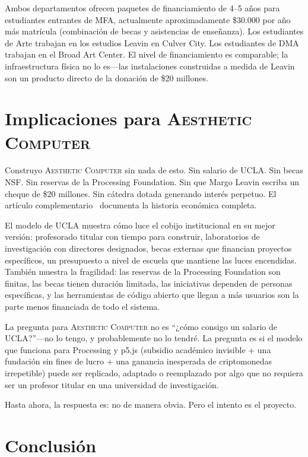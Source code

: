 \documentclass[10pt,letterpaper,twocolumn]{article}
\newcommand{\ac}{\textsc{Aesthetic Computer}}
\newcommand{\dma}{\textsc{DMA}}
\begin{document}
Ambos departamentos ofrecen paquetes de financiamiento de 4--5 años para estudiantes entrantes de MFA, actualmente aproximadamente \$30.000 por año más matrícula (combinación de becas y asistencias de enseñanza). Los estudiantes de Arte trabajan en los estudios Leavin en Culver City. Los estudiantes de \dma{} trabajan en el Broad Art Center. El nivel de financiamiento es comparable; la infraestructura física no lo es---las instalaciones construidas a medida de Leavin son un producto directo de la donación de \$20 millones.

\section{Implicaciones para \ac{}}

Construyo \ac{} sin nada de esto. Sin salario de UCLA. Sin becas NSF. Sin reservas de la Processing Foundation. Sin que Margo Leavin escriba un cheque de \$20 millones. Sin cátedra dotada generando interés perpetuo. El artículo complementario~\citep{scudder2026sustainability} documenta la historia económica completa.

El modelo de UCLA muestra cómo luce el cobijo institucional en su mejor versión: profesorado titular con tiempo para construir, laboratorios de investigación con directores designados, becas externas que financian proyectos específicos, un presupuesto a nivel de escuela que mantiene las luces encendidas. También muestra la fragilidad: las reservas de la Processing Foundation son finitas, las becas tienen duración limitada, las iniciativas dependen de personas específicas, y las herramientas de código abierto que llegan a más usuarios son la parte menos financiada de todo el sistema.

La pregunta para \ac{} no es ``¿cómo consigo un salario de UCLA?''---no lo tengo, y probablemente no lo tendré. La pregunta es si el modelo que funciona para Processing y p5.js (subsidio académico invisible + una fundación sin fines de lucro + una ganancia inesperada de criptomonedas irrepetible) puede ser replicado, adaptado o reemplazado por algo que no requiera ser un profesor titular en una universidad de investigación.

Hasta ahora, la respuesta es: no de manera obvia. Pero el intento es el proyecto.

\section{Conclusión}
\end{document}
